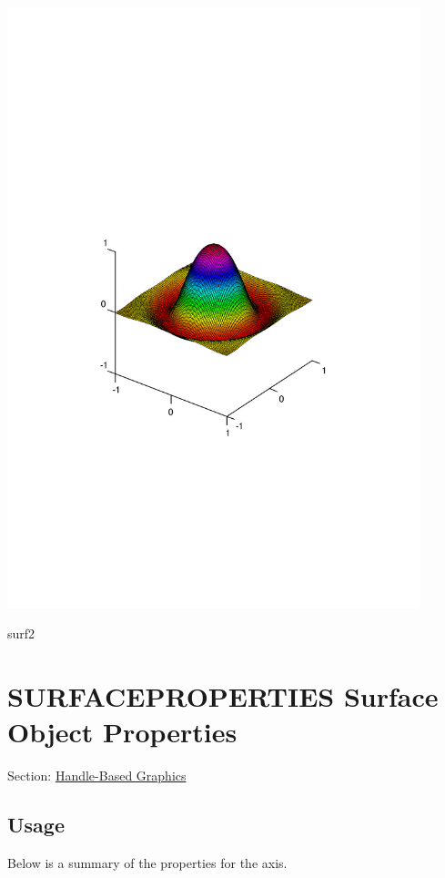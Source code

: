  
\begin{DoxyImage}
\includegraphics[width=12cm]{surf2}
\caption{surf2}
\end{DoxyImage}
 \hypertarget{handle_surfaceproperties}{}\section{S\-U\-R\-F\-A\-C\-E\-P\-R\-O\-P\-E\-R\-T\-I\-E\-S Surface Object Properties}\label{handle_surfaceproperties}
Section\-: \hyperlink{sec_handle}{Handle-\/\-Based Graphics} \hypertarget{vtkwidgets_vtkxyplotwidget_Usage}{}\subsection{Usage}\label{vtkwidgets_vtkxyplotwidget_Usage}
Below is a summary of the properties for the axis. 
